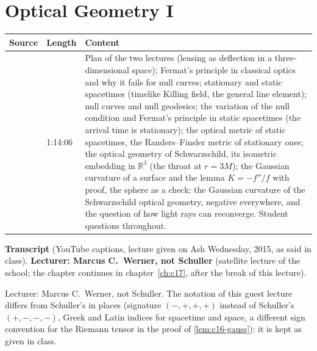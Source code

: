 \chapter{Optical Geometry I}\label{ch:c16}
\begin{paracol}{2}

\begin{sources}
\begin{tabularx}{\linewidth}{@{}l l L@{}}
\toprule
\textbf{Source} & \textbf{Length} & \textbf{Content}\\
\midrule
{} & 1:14:06 & Plan of the two lectures (lensing as deflection in a three-dimensional space); Fermat's principle in classical optics and why it fails for null curves; stationary and static spacetimes (timelike Killing field, the general line element); null curves and null geodesics; the variation of the null condition and Fermat's principle in static spacetimes (the arrival time is stationary); the optical metric of static spacetimes, the Randers--Finsler metric of stationary ones; the optical geometry of Schwarzschild, its isometric embedding in $\mathbb R^3$ (the throat at $r=3M$); the Gaussian curvature of a surface and the lemma $K=-f''/f$ with proof, the sphere as a check; the Gaussian curvature of the Schwarzschild optical geometry, negative everywhere, and the question of how light rays can reconverge. Student questions throughout.\\
\bottomrule
\end{tabularx}

\smallskip
\textbf{Transcript}  (YouTube captions, lecture given on Ash Wednesday, 2015, as said in class). \textbf{Lecturer: Marcus C.\ Werner, not Schuller} (satellite lecture of the school; the chapter continues in chapter~\ref{ch:c17}, after the break of this lecture).
\end{sources}

\begin{coursenote}[Lecturer]
Lecturer: Marcus C.\ Werner, not Schuller. The notation of this guest lecture differs from Schuller's in places (signature $(-,+,+,+)$ instead of Schuller's $(+,-,-,-)$, Greek and Latin indices for spacetime and space, a different sign convention for the Riemann tensor in the proof of \cref{lem:c16-gauss}): it is kept as given in class.
\end{coursenote}


\end{paracol}
